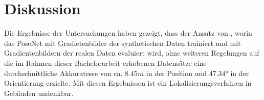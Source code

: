 
\section{Diskussion}
\label{sec:kapitel_5}

Die Ergebnisse der Untersuchungen haben gezeigt, dass der Ansatz von \citet{acharyaBIMPoseNetIndoorCamera2019}, worin das PoseNet mit Gradietenbilder der synthetischen Daten trainiert und mit Gradientenbildern der realen Daten evaluiert wird,  ohne weiteren Regelungen auf die im Rahmen dieser Bachelorarbeit erhobenen Datensätze eine durchschnittliche Akkuratesse von ca. 8.45$m$ in der Position und 47.34° in der Orientierung erzielte. Mit diesen Ergebnissen ist ein Lokalisierungsverfahren in Gebäuden undenkbar.



% 




